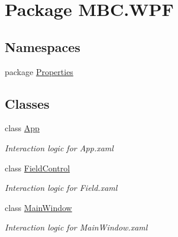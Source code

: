 \hypertarget{namespace_m_b_c_1_1_w_p_f}{\section{Package M\-B\-C.\-W\-P\-F}
\label{namespace_m_b_c_1_1_w_p_f}
}
\subsection*{Namespaces}
\begin{DoxyCompactItemize}
\item 
package \hyperlink{namespace_m_b_c_1_1_w_p_f_1_1_properties}{Properties}
\end{DoxyCompactItemize}
\subsection*{Classes}
\begin{DoxyCompactItemize}
\item 
class \hyperlink{class_m_b_c_1_1_w_p_f_1_1_app}{App}
\begin{DoxyCompactList}\small\item\em Interaction logic for App.\-xaml \end{DoxyCompactList}\item 
class \hyperlink{class_m_b_c_1_1_w_p_f_1_1_field_control}{Field\-Control}
\begin{DoxyCompactList}\small\item\em Interaction logic for Field.\-xaml \end{DoxyCompactList}\item 
class \hyperlink{class_m_b_c_1_1_w_p_f_1_1_main_window}{Main\-Window}
\begin{DoxyCompactList}\small\item\em Interaction logic for Main\-Window.\-xaml \end{DoxyCompactList}\end{DoxyCompactItemize}
